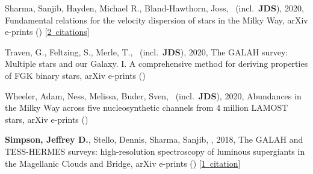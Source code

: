 \item[{\color{numcolor}\scriptsize4}] Sharma, Sanjib, Hayden, Michael R., Bland-Hawthorn, Joss, \etal\ (incl.\ \textbf{JDS}), 2020, Fundamental relations for the velocity dispersion of stars in the Milky Way, arXiv e-prints () [\href{https://ui.adsabs.harvard.edu/#abs/2020arXiv200406556S}{2~citations}]

\item[{\color{numcolor}\scriptsize3}] Traven, G., Feltzing, S., Merle, T., \etal\ (incl.\ \textbf{JDS}), 2020, The GALAH survey: Multiple stars and our Galaxy. I. A comprehensive method for deriving properties of FGK binary stars, arXiv e-prints ()

\item[{\color{numcolor}\scriptsize2}] Wheeler, Adam, Ness, Melissa, Buder, Sven, \etal\ (incl.\ \textbf{JDS}), 2020, Abundances in the Milky Way across five nucleosynthetic channels from 4 million LAMOST stars, arXiv e-prints ()

\item[{\color{numcolor}\scriptsize1}] \textbf{Simpson, Jeffrey D.}, Stello, Dennis, Sharma, Sanjib, \etal, 2018, The GALAH and TESS-HERMES surveys: high-resolution spectroscopy of luminous supergiants in the Magellanic Clouds and Bridge, arXiv e-prints () [\href{https://ui.adsabs.harvard.edu/#abs/2018arXiv180405900S}{1~citation}]